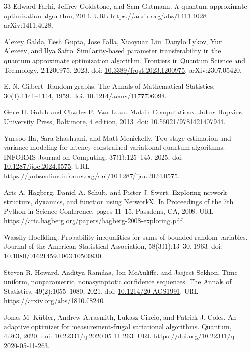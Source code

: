 \documentclass[11pt]{article}
\begin{document}
\begin{thebibliography}{33}
Edward Farhi, Jeffrey Goldstone, and Sam Gutmann. A quantum approximate optimization algorithm, 2014. URL \url{https://arxiv.org/abs/1411.4028}. arXiv:1411.4028.

Alexey Galda, Eesh Gupta, Jose Falla, Xiaoyuan Liu, Danylo Lykov, Yuri Alexeev, and Ilya Safro. Similarity-based parameter transferability in the quantum approximate optimization algorithm. Frontiers in Quantum Science and Technology, 2:1200975, 2023. doi: \href{https://doi.org/10.3389/frqst.2023.1200975}{10.3389/frqst.2023.1200975}. arXiv:2307.05420.

E. N. Gilbert. Random graphs. The Annals of Mathematical Statistics, 30(4):1141--1144, 1959. doi: \href{https://doi.org/10.1214/aoms/1177706098}{10.1214/aoms/1177706098}.

Gene H. Golub and Charles F. Van Loan. Matrix Computations. Johns Hopkins University Press, Baltimore, 4 edition, 2013. doi: \href{https://doi.org/10.56021/9781421407944}{10.56021/9781421407944}.

Yunsoo Ha, Sara Shashaani, and Matt Menickelly. Two-stage estimation and variance modeling for latency-constrained variational quantum algorithms. INFORMS Journal on Computing, 37(1):125--145, 2025. doi: \href{https://doi.org/10.1287/ijoc.2024.0575}{10.1287/ijoc.2024.0575}. URL \url{https://pubsonline.informs.org/doi/10.1287/ijoc.2024.0575}.

Aric A. Hagberg, Daniel A. Schult, and Pieter J. Swart. Exploring network structure, dynamics, and function using NetworkX. In Proceedings of the 7th Python in Science Conference, pages 11--15, Pasadena, CA, 2008. URL \url{https://aric.hagberg.org/papers/hagberg-2008-exploring.pdf}.

Wassily Hoeffding. Probability inequalities for sums of bounded random variables. Journal of the American Statistical Association, 58(301):13--30, 1963. doi: \href{https://doi.org/10.1080/01621459.1963.10500830}{10.1080/01621459.1963.10500830}.

Steven R. Howard, Aaditya Ramdas, Jon McAuliffe, and Jasjeet Sekhon. Time-uniform, nonparametric, nonasymptotic confidence sequences. The Annals of Statistics, 49(2):1055--1080, 2021. doi: \href{https://doi.org/10.1214/20-AOS1991}{10.1214/20-AOS1991}. URL \url{https://arxiv.org/abs/1810.08240}.

Jonas M. K\"ubler, Andrew Arrasmith, Lukasz Cincio, and Patrick J. Coles. An adaptive optimizer for measurement-frugal variational algorithms. Quantum, 4:263, 2020. doi: \href{https://doi.org/10.22331/q-2020-05-11-263}{10.22331/q-2020-05-11-263}. URL \url{https://doi.org/10.22331/q-2020-05-11-263}.


\end{thebibliography}
\end{document}

